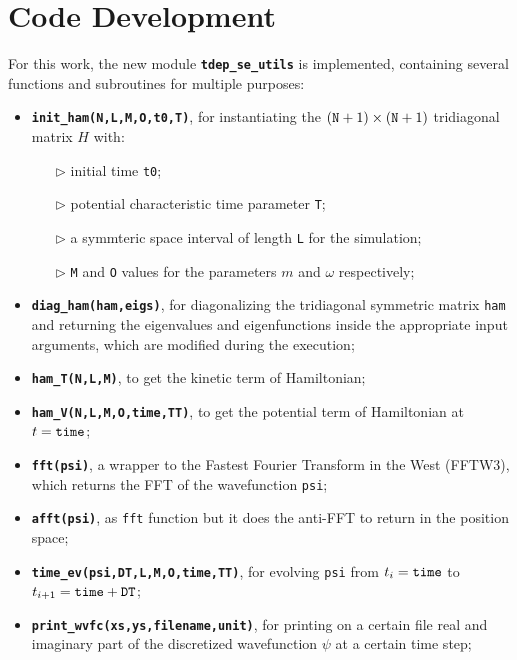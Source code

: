 \documentclass[pra, onecolumn, notitlepage, floats, 11pt]{revtex4-1}
\newcommand{\codebold}[2][cobalt]{\texttt{\bfseries {\color{#1}#2}}}
\newcommand{\code}[2][black]{\color{#1}\texttt{#2}}
\newcommand{\codefunctionbold}[2]{\texttt{\bfseries {\color{cobalt}#1}({\color{lava}#2})}}
\begin{document}
\section{Code Development}
For this work, the new module \codebold{tdep\_se\_utils} is implemented, containing several functions and subroutines for multiple purposes:
\vspace{-5pt}
\begin{itemize}%
    \setlength\itemsep{-3pt}
    \item \codefunctionbold{init\_ham}{N,L,M,O,t0,T}, for instantiating the \( (\code{N}+1) \times (\code{N}+1) \) tridiagonal matrix \( H \) with:
    \vspace{-10pt}
    \begin{itemize}
        \setlength\itemsep{-3pt}
        \item[\( \triangleright \)] initial time \code{t0};
        \item[\( \triangleright \)] potential characteristic time parameter \code{T};
        \item[\( \triangleright \)] a symmteric space interval of length \code{L} for the simulation;
        \item[\( \triangleright \)] \code{M} and \code{O} values for the parameters \( m \) and \( \omega \) respectively;
    \end{itemize}
    \vspace{-8pt}
    \item \codefunctionbold{diag\_ham}{ham,eigs}, for diagonalizing the tridiagonal symmetric matrix \code{ham} and returning the eigenvalues and eigenfunctions inside the appropriate input arguments, which are modified during the execution;
    \item \codefunctionbold{ham\_T}{N,L,M}, to get the kinetic term of Hamiltonian;
    \item \codefunctionbold{ham\_V}{N,L,M,O,time,TT}, to get the potential term of Hamiltonian at \( t = \code{time} \);
    \item \codefunctionbold{fft}{psi}, a wrapper to the Fastest Fourier Transform in the West (FFTW3), which returns the FFT of the wavefunction \code{psi};
    \item \codefunctionbold{afft}{psi}, as \code{fft} function but it does the anti-FFT to return in the position space;
    \item \codefunctionbold{time\_ev}{psi,DT,L,M,O,time,TT}, for evolving \code{psi} from \( t_{i} = \code{time} \) to \( t_{i+1} = \code{time} + \code{DT} \);
    \item \codefunctionbold{print\_wvfc}{xs,ys,filename,unit}, for printing on a certain file real and imaginary part of the discretized wavefunction \( \psi \) at a certain time step;

\end{itemize}
\end{document}
